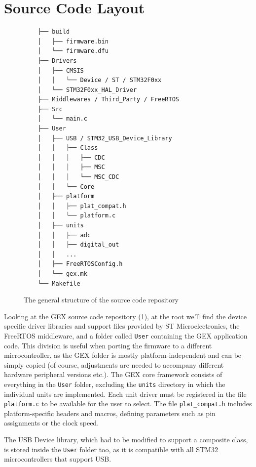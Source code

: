 \section{Source Code Layout}

\begin{figure}
	\scriptsize\vspace{-3em}
	\begin{verbatim}
	├── build
	│   ├── firmware.bin
	│   └── firmware.dfu
	├── Drivers
	│   ├── CMSIS
	│   │   └── Device / ST / STM32F0xx
	│   └── STM32F0xx_HAL_Driver
	├── Middlewares / Third_Party / FreeRTOS
	├── Src
	│   └── main.c
	├── User
	│   ├── USB / STM32_USB_Device_Library
	│   │   ├── Class
	│   │   │   ├── CDC
	│   │   │   ├── MSC
	│   │   │   └── MSC_CDC
	│   │   └── Core
	│   ├── platform
	│   │   ├── plat_compat.h
	│   │   └── platform.c
	│   ├── units
	│   │   ├── adc
	│   │   ├── digital_out
	│   │   ...
	│   ├── FreeRTOSConfig.h
	│   └── gex.mk
	└── Makefile
	\end{verbatim}
	\vspace{-1em}
	\caption{\label{fig:repo_structure} The general structure of the source code repository}
\end{figure}

Looking at the GEX source code repository (\cref{fig:repo_structure}), at the root we'll find the device specific driver libraries and support files provided by ST Microelectronics, the FreeRTOS middleware, and a folder called \verb|User| containing the GEX application code. This division is useful when porting the firmware to a different microcontroller, as the GEX folder is mostly platform-independent and can be simply copied (of course, adjustments are needed to accompany different hardware peripheral versions etc.). The GEX core framework consists of everything in the \verb|User| folder, excluding the \verb|units| directory in which the individual units are implemented. Each unit driver must be registered in the file \verb|platform.c| to be available for the user to select. The file \verb|plat_compat.h| includes platform-specific headers and macros, defining parameters such as pin assignments or the clock speed.

The \gls{USB} Device library, which had to be modified to support a composite class, is stored inside the \verb|User| folder too, as it is compatible with all STM32 microcontrollers that support \gls{USB}.











